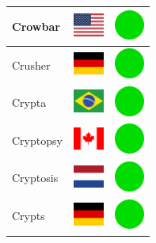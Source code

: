 \documentclass[12pt, a4paper, twoside]{report}
\begin{document}
\begin{center}
\begin{longtable}{|p{5cm}|p{2cm}|p{2cm}|}
 Crowbar                                                    & \includegraphics[width=1cm]{../4x3/us} &   \includegraphics[width=1cm]{../likes/y} \\ \hline
 Crusher                                                    & \includegraphics[width=1cm]{../4x3/de} &   \includegraphics[width=1cm]{../likes/y} \\ \hline
 Crypta                                                     & \includegraphics[width=1cm]{../4x3/br} &   \includegraphics[width=1cm]{../likes/y} \\ \hline
 Cryptopsy                                                  & \includegraphics[width=1cm]{../4x3/ca} &   \includegraphics[width=1cm]{../likes/y} \\ \hline
 Cryptosis                                                  & \includegraphics[width=1cm]{../4x3/nl} &   \includegraphics[width=1cm]{../likes/y} \\ \hline
 Crypts                                                     & \includegraphics[width=1cm]{../4x3/de} &   \includegraphics[width=1cm]{../likes/y} \\ \hline

\end{longtable}
\end{center}
\end{document}
